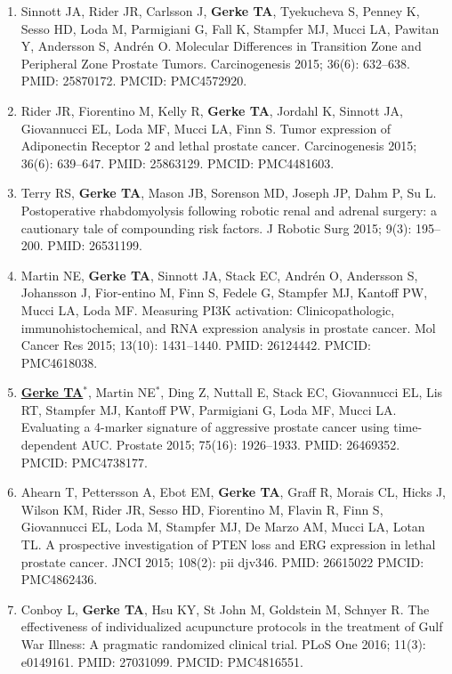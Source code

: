 \documentclass[11pt, a4paper]{article} %
\begin{document}
\begin{enumerate}[leftmargin=*]
\item{} Sinnott JA, Rider JR, Carlsson J, {\bf Gerke TA}, Tyekucheva S, Penney K, Sesso HD, Loda M, Parmigiani G, Fall K, Stampfer MJ, Mucci LA, Pawitan Y, Andersson S, Andr\'{e}n O. Molecular Differences in Transition Zone and Peripheral Zone Prostate Tumors. Carcinogenesis 2015; 36(6): 632--638. PMID: 25870172. PMCID: PMC4572920.

\item{} Rider JR, Fiorentino M, Kelly R, {\bf Gerke TA}, Jordahl K, Sinnott JA, Giovannucci EL, Loda MF, Mucci LA, Finn S. Tumor expression of {Adiponectin Receptor 2} and lethal prostate cancer. Carcinogenesis 2015; 36(6): 639--647. PMID: 25863129. PMCID: PMC4481603.

\item{} Terry RS, {\bf Gerke TA}, Mason JB, Sorenson MD, Joseph JP, Dahm P, Su L. Postoperative rhabdomyolysis following robotic renal and adrenal surgery: a cautionary tale of compounding risk factors. J Robotic Surg 2015; 9(3): 195--200. PMID: 26531199.

\item{} Martin NE, {\bf Gerke TA}, Sinnott JA, Stack EC, Andr\'{e}n O, Andersson S, Johansson J, Fior-entino M, Finn S, Fedele G, Stampfer MJ, Kantoff PW, Mucci LA, Loda MF. Measuring PI3K activation: Clinicopathologic, immunohistochemical, and RNA expression analysis in prostate cancer. Mol Cancer Res 2015; 13(10): 1431--1440. PMID: 26124442. PMCID: PMC4618038.

\item{} \underline{{\bf Gerke TA$^*$}}, Martin NE$^*$, Ding Z, Nuttall E, Stack EC, Giovannucci EL, Lis RT, Stampfer MJ, Kantoff PW, Parmigiani G, Loda MF, Mucci LA. Evaluating a 4-marker signature of aggressive prostate cancer using time-dependent AUC. Prostate 2015; 75(16): 1926--1933. PMID: 26469352. PMCID: PMC4738177.

\item{} Ahearn T, Pettersson A, Ebot EM, {\bf Gerke TA}, Graff R, Morais CL, Hicks J, Wilson KM, Rider JR, Sesso HD, Fiorentino M, Flavin R, Finn S, Giovannucci EL, Loda M, Stampfer MJ, De Marzo AM, Mucci LA, Lotan TL. A prospective investigation of PTEN loss and ERG expression in lethal prostate cancer. JNCI 2015; 108(2): pii djv346. PMID: 26615022 PMCID: PMC4862436.

\item{} Conboy L, {\bf Gerke TA}, Hsu KY, {St John} M, Goldstein M, Schnyer R. The effectiveness of individualized acupuncture protocols in the treatment of Gulf War Illness: A pragmatic randomized clinical trial. PLoS One 2016; 11(3): e0149161. PMID: 27031099. PMCID: PMC4816551.


\end{enumerate}
\end{document}
